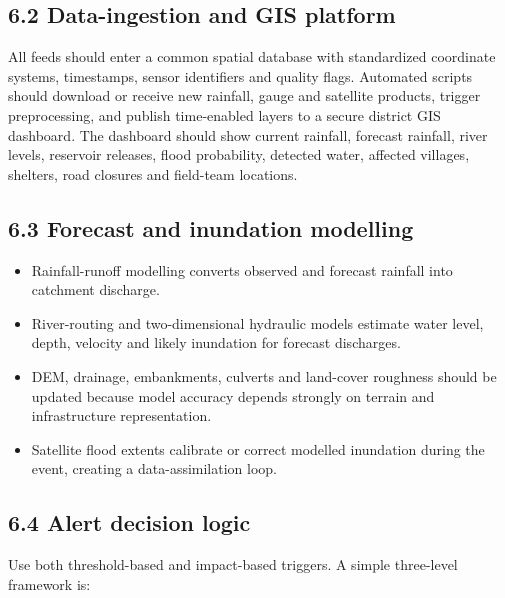 \documentclass[11pt,a4paper]{article}
\begin{document}
\subsection{6.2 Data-ingestion and GIS platform}\label{data-ingestion-and-gis-platform}

All feeds should enter a common spatial database with standardized coordinate systems, timestamps, sensor identifiers and quality flags. Automated scripts should download or receive new rainfall, gauge and satellite products, trigger preprocessing, and publish time-enabled layers to a secure district GIS dashboard. The dashboard should show current rainfall, forecast rainfall, river levels, reservoir releases, flood probability, detected water, affected villages, shelters, road closures and field-team locations.

\subsection{6.3 Forecast and inundation modelling}\label{forecast-and-inundation-modelling}

\begin{itemize}
\item
  Rainfall-runoff modelling converts observed and forecast rainfall into catchment discharge.
\item
  River-routing and two-dimensional hydraulic models estimate water level, depth, velocity and likely inundation for forecast discharges.
\item
  DEM, drainage, embankments, culverts and land-cover roughness should be updated because model accuracy depends strongly on terrain and infrastructure representation.
\item
  Satellite flood extents calibrate or correct modelled inundation during the event, creating a data-assimilation loop.
\end{itemize}

\subsection{6.4 Alert decision logic}\label{alert-decision-logic}

Use both threshold-based and impact-based triggers. A simple three-level framework is:
\end{document}
